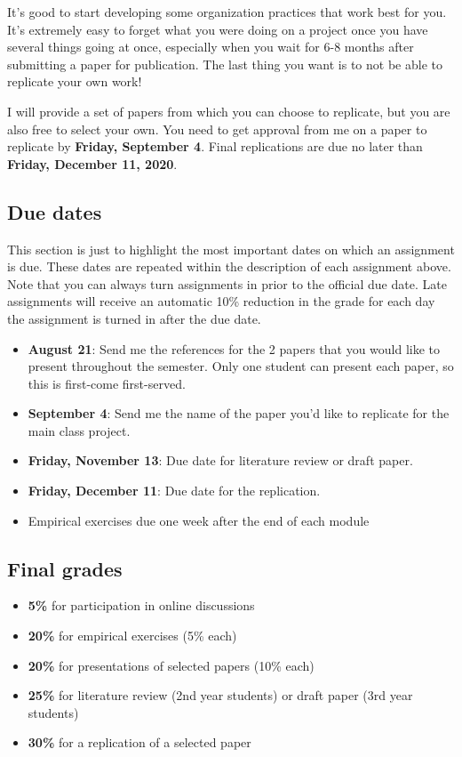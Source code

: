 \documentclass[11pt,]{article}
\providecommand{\tightlist}{%
  \setlength{\itemsep}{0pt}\setlength{\parskip}{0pt}}
\begin{document}
It's good to start developing some organization practices that work best
for you. It's extremely easy to forget what you were doing on a project
once you have several things going at once, especially when you wait for
6-8 months after submitting a paper for publication. The last thing you
want is to not be able to replicate your own work!

I will provide a set of papers from which you can choose to replicate,
but you are also free to select your own. You need to get approval from
me on a paper to replicate by \textbf{Friday, September 4}. Final
replications are due no later than \textbf{Friday, December 11, 2020}.

\hypertarget{due-dates}{%
\subsection{Due dates}\label{due-dates}}

This section is just to highlight the most important dates on which an
assignment is due. These dates are repeated within the description of
each assignment above. Note that you can always turn assignments in
prior to the official due date. Late assignments will receive an
automatic 10\% reduction in the grade for each day the assignment is
turned in after the due date.

\begin{itemize}
\tightlist
\item
  \textbf{August 21}: Send me the references for the 2 papers that you
  would like to present throughout the semester. Only one student can
  present each paper, so this is first-come first-served.
\item
  \textbf{September 4}: Send me the name of the paper you'd like to
  replicate for the main class project.
\item
  \textbf{Friday, November 13}: Due date for literature review or draft
  paper.
\item
  \textbf{Friday, December 11}: Due date for the replication.
\item
  Empirical exercises due one week after the end of each module
\end{itemize}

\hypertarget{final-grades}{%
\subsection{Final grades}\label{final-grades}}

\begin{itemize}
\item
  \textbf{5\%} for participation in online discussions
\item
  \textbf{20\%} for empirical exercises (5\% each)
\item
  \textbf{20\%} for presentations of selected papers (10\% each)
\item
  \textbf{25\%} for literature review (2nd year students) or draft paper
  (3rd year students)
\item
  \textbf{30\%} for a replication of a selected paper
\end{itemize}
\end{document}
